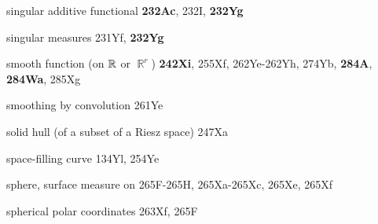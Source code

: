 

singular additive functional {\bf 232Ac}, 232I, {\bf 232Yg}




singular measures 231Yf, {\bf 232Yg}















smooth function (on $\Bbb R$ or $\BbbR^r$) {\bf 242Xi}, 255Xf,
262Ye-262Yh, 
274Yb, {\bf 284A}, {\bf 284Wa}, 285Xg




smoothing by convolution 261Ye







solid hull (of a subset of a Riesz space) 247Xa

































space-filling curve 134Yl, 254Ye 








sphere, surface measure on 265F-265H, 
265Xa-265Xc, 
265Xe, 265Xf




spherical polar coordinates 263Xf, 265F














